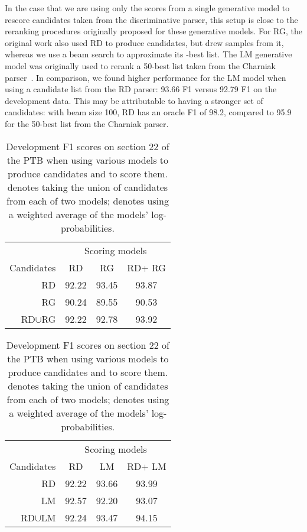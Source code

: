 \documentclass[11pt,a4paper]{article}
\newcommand{\rnngd}{\textsc{RD}\xspace}
\newcommand{\lstm}{\textsc{LM}\xspace}
\newcommand{\rnngg}{\textsc{RG}\xspace}
\newcommand{\un}{\ensuremath{\cup}\xspace}
\begin{document}
In the case that we are using only the scores from a single generative model to rescore candidates taken from the discriminative parser, this setup is close to the reranking procedures originally proposed for these generative models. For RG, the original work also used RD to produce candidates, but drew samples from it, whereas we use a beam search to approximate its -best list. 
The LM generative model was originally used to rerank a 50-best list taken from the Charniak parser~\citep{Charniak:2000:MP:974305.974323}. In comparison, we found higher performance for the LM model when using a candidate list from the RD parser: 93.66 F1 versus 92.79 F1 on the development data. This may be attributable to having a stronger set of candidates: with beam size 100, RD has an oracle F1 of 98.2, compared to 95.9 for the 50-best list from the Charniak parser.

\begin{table}
\centering
\begin{tabular}{r|ccc}
& \multicolumn{3}{c}{Scoring models} \\
Candidates & \rnngd & \rnngg & \rnngd+ \rnngg \\
\hline
\rnngd & 92.22 & 93.45 & 93.87 \\
\rnngg & 90.24 & 89.55 & 90.53 \\
\rnngd \un \rnngg & 92.22 & 92.78 & 93.92  \\
\end{tabular}

\vspace{5pt}

\begin{tabular}{r|ccc}
& \multicolumn{3}{c}{Scoring models} \\
Candidates & \rnngd & \lstm & \rnngd+ \lstm \\
\hline
\rnngd & 92.22 & 93.66 & 93.99 \\
\lstm & 92.57 & 92.20 & 93.07 \\
\rnngd \un \lstm & 92.24 & 93.47 & 94.15  \\
\end{tabular}
\caption{\label{tab:lstm_model_score_combos} Development F1 scores on section 22 of the PTB when using various models to produce candidates and to score them.  denotes taking the union of candidates from each of two models;  denotes using a weighted average of the models' log-probabilities.
\vspace{-1em}
}
\end{table}
\end{document}
